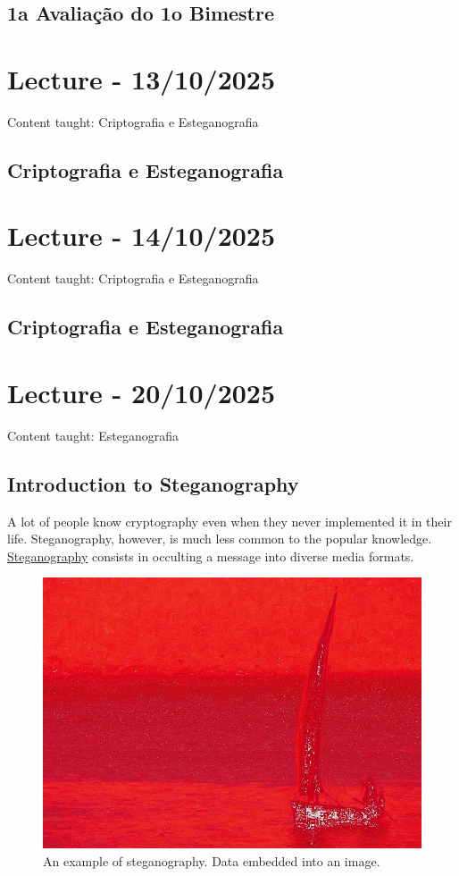 \documentclass{article}
\begin{document}
\subsection{1a Avaliação do 1o Bimestre}

\section{Lecture - 13/10/2025}
Content taught: Criptografia e Esteganografia
\subsection{Criptografia e Esteganografia}

\section{Lecture - 14/10/2025}
Content taught: Criptografia e Esteganografia
\subsection{Criptografia e Esteganografia}

\section{Lecture - 20/10/2025}
Content taught: Esteganografia
\subsection{Introduction to Steganography}
A lot of people know cryptography even when they never implemented it in their life. Steganography, however, is much less common to the popular knowledge. \href{https://en.wikipedia.org/wiki/Steganography}{Steganography} consists in occulting a message into diverse media formats.

\begin{figure}
\centering
\includegraphics[width=0.5\linewidth]{./images/outguess-compare.jpg}
\caption{\label{fig:steganography-example}An example of steganography. Data embedded into an image.}
\end{figure}
\end{document}
